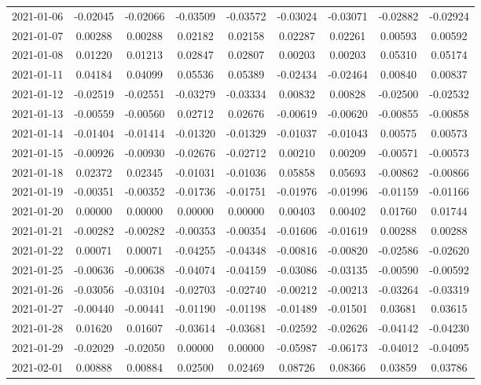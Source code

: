 {\begin{footnotesize}
\begin{longtable}{lcccccccc}
2021-01-06 & -0.02045 & -0.02066 & -0.03509 & -0.03572 & -0.03024 & -0.03071 & -0.02882 & -0.02924 \\
2021-01-07 & 0.00288 & 0.00288 & 0.02182 & 0.02158 & 0.02287 & 0.02261 & 0.00593 & 0.00592 \\
2021-01-08 & 0.01220 & 0.01213 & 0.02847 & 0.02807 & 0.00203 & 0.00203 & 0.05310 & 0.05174 \\
2021-01-11 & 0.04184 & 0.04099 & 0.05536 & 0.05389 & -0.02434 & -0.02464 & 0.00840 & 0.00837 \\
2021-01-12 & -0.02519 & -0.02551 & -0.03279 & -0.03334 & 0.00832 & 0.00828 & -0.02500 & -0.02532 \\
2021-01-13 & -0.00559 & -0.00560 & 0.02712 & 0.02676 & -0.00619 & -0.00620 & -0.00855 & -0.00858 \\
2021-01-14 & -0.01404 & -0.01414 & -0.01320 & -0.01329 & -0.01037 & -0.01043 & 0.00575 & 0.00573 \\
2021-01-15 & -0.00926 & -0.00930 & -0.02676 & -0.02712 & 0.00210 & 0.00209 & -0.00571 & -0.00573 \\
2021-01-18 & 0.02372 & 0.02345 & -0.01031 & -0.01036 & 0.05858 & 0.05693 & -0.00862 & -0.00866 \\
2021-01-19 & -0.00351 & -0.00352 & -0.01736 & -0.01751 & -0.01976 & -0.01996 & -0.01159 & -0.01166 \\
2021-01-20 & 0.00000 & 0.00000 & 0.00000 & 0.00000 & 0.00403 & 0.00402 & 0.01760 & 0.01744 \\
2021-01-21 & -0.00282 & -0.00282 & -0.00353 & -0.00354 & -0.01606 & -0.01619 & 0.00288 & 0.00288 \\
2021-01-22 & 0.00071 & 0.00071 & -0.04255 & -0.04348 & -0.00816 & -0.00820 & -0.02586 & -0.02620 \\
2021-01-25 & -0.00636 & -0.00638 & -0.04074 & -0.04159 & -0.03086 & -0.03135 & -0.00590 & -0.00592 \\
2021-01-26 & -0.03056 & -0.03104 & -0.02703 & -0.02740 & -0.00212 & -0.00213 & -0.03264 & -0.03319 \\
2021-01-27 & -0.00440 & -0.00441 & -0.01190 & -0.01198 & -0.01489 & -0.01501 & 0.03681 & 0.03615 \\
2021-01-28 & 0.01620 & 0.01607 & -0.03614 & -0.03681 & -0.02592 & -0.02626 & -0.04142 & -0.04230 \\
2021-01-29 & -0.02029 & -0.02050 & 0.00000 & 0.00000 & -0.05987 & -0.06173 & -0.04012 & -0.04095 \\
2021-02-01 & 0.00888 & 0.00884 & 0.02500 & 0.02469 & 0.08726 & 0.08366 & 0.03859 & 0.03786 \\

\end{longtable}
\end{footnotesize}}
